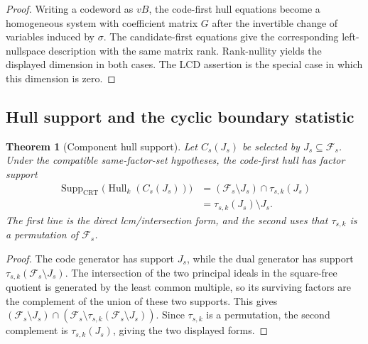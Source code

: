 \documentclass[11pt]{article}
\newcommand{\Fs}{\mathcal F_s}
\newcommand{\Hull}{\operatorname{Hull}}
\theoremstyle{plain}
\newtheorem{theorem}{Theorem}
\theoremstyle{definition}
\theoremstyle{remark}
\begin{document}
\begin{proof}
Writing a codeword as $vB$, the code-first hull equations become a homogeneous system with coefficient matrix $G$ after the invertible change of variables induced by $\sigma$. The candidate-first equations give the corresponding left-nullspace description with the same matrix rank. Rank-nullity yields the displayed dimension in both cases. The LCD assertion is the special case in which this dimension is zero.
\end{proof}

\subsection{Hull support and the cyclic boundary statistic}

\begin{theorem}[Component hull support]\label{thm:hull-support}
Let $C_s(J_s)$ be selected by $J_s\subseteq\Fs$. Under the compatible same-factor-set hypotheses, the code-first hull has factor support
\begin{equation}\label{eq:support}
\begin{aligned}
\operatorname{Supp}_{\mathrm{CRT}}\bigl(\Hull_k(C_s(J_s))\bigr)
 &= (\Fs\setminus J_s)\cap\tau_{s,k}(J_s)\\
 &= \tau_{s,k}(J_s)\setminus J_s.
\end{aligned}
\end{equation}
The first line is the direct lcm/intersection form, and the second uses that $\tau_{s,k}$ is a permutation of $\Fs$.
\end{theorem}

\begin{proof}
The code generator has support $J_s$, while the dual generator has support $\tau_{s,k}(\Fs\setminus J_s)$. The intersection of the two principal ideals in the square-free quotient is generated by the least common multiple, so its surviving factors are the complement of the union of these two supports. This gives
$(\Fs\setminus J_s)\cap(\Fs\setminus\tau_{s,k}(\Fs\setminus J_s))$.
Since $\tau_{s,k}$ is a permutation, the second complement is $\tau_{s,k}(J_s)$, giving the two displayed forms.
\end{proof}
\end{document}
